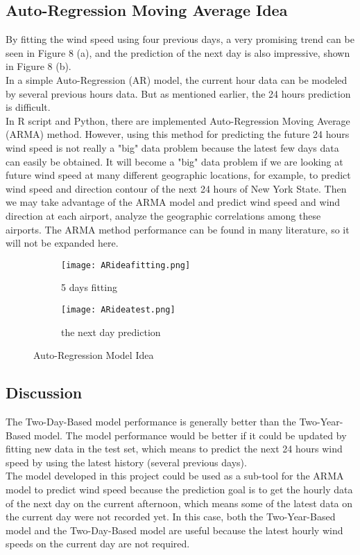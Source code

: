 \documentclass{article}
\begin{document}
\subsection*{Auto-Regression Moving Average Idea}
By fitting the wind speed using four previous days, a very promising trend can be seen in Figure 8 (a), and the prediction of the next day is also impressive, shown in Figure 8 (b).\\
In a simple Auto-Regression (AR) model, the current hour data can be modeled by several previous hours data.  But as mentioned earlier, the 24 hours prediction is difficult.\\
In R script and Python, there are implemented  Auto-Regression Moving Average (ARMA) method.  However, using this method for predicting the future 24 hours wind speed is not really a "big" data problem because the latest few days data can easily be obtained.  It will become a "big" data problem if we are looking at future wind speed at many different geographic locations, for example, to predict wind speed and direction contour of the next 24 hours of New York State.  Then we may take advantage of the ARMA model and predict wind speed and wind direction at each airport, analyze the geographic correlations among these airports.  The ARMA method performance can be found in many literature, so it will not be expanded here. 

\begin{figure}[h]
  \begin{subfigure}[b]{0.5\textwidth}
    \texttt{[image: ARideafitting.png]}
    \caption{5 days fitting} 
    \label{fig:f1}
  \end{subfigure}
  \hfill
  \begin{subfigure}[b]{0.5\textwidth}
    \texttt{[image: ARideatest.png]}
    \caption{the next day prediction}
    \label{fig:f2}
  \end{subfigure}
  \caption{Auto-Regression Model Idea}
\end{figure}

\subsection*{Discussion}

The Two-Day-Based model performance is generally better than the Two-Year-Based model.  The model performance would be better if it could be updated by fitting new data in the test set, which means to predict the next 24 hours wind speed by using the latest history (several previous days).\\
The model developed in this project could be used as a sub-tool for the ARMA model to predict wind speed because the prediction goal is to get the hourly data of the next day on the current afternoon, which means some of the latest data on the current day were not recorded yet.  In this case, both the Two-Year-Based model and the Two-Day-Based model are useful because the latest hourly wind speeds on the current day are not required.\\
\end{document}

